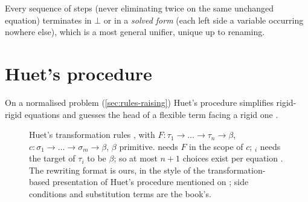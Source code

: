 \begin{theorem}[\book{28--29}]\label{thm:rules-fo}
Every sequence of steps (never eliminating twice on the same unchanged equation) terminates in $\bot$ or in a \emph{solved form} (each left side a variable occurring nowhere else), which is a most general unifier, unique up to renaming.
\end{theorem}

\section{Huet's procedure}\label{sec:rules-huet}

On a normalised problem (\cref{sec:rules-raising}) Huet's procedure simplifies rigid-rigid equations and guesses the head of a flexible term facing a rigid one .

\begin{figure}[htbp]
\small
{}
\caption{Huet's transformation rules , with $F:\tau_1\to\dots\to\tau_n\to\beta$, $c:\sigma_1\to\dots\to\sigma_m\to\beta$, $\beta$ primitive.  needs $F$ in the scope of $c$; $_i$ needs the target of $\tau_i$ to be $\beta$; so at most $n+1$ choices exist per equation . The rewriting format is ours, in the style of the transformation-based presentation of Huet's procedure \cite{Huet1975} mentioned on ; side conditions and substitution terms are the book's.}\label{fig:rules-huet}
\end{figure}

